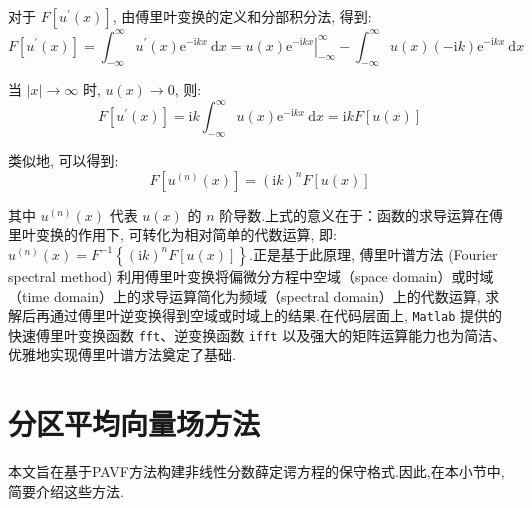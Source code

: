 对于 $F\left[u^{\prime}(x)\right]$, 由傅里叶变换的定义和分部积分法, 得到:
\begin{equation}
    F\left[u^{\prime}(x)\right] = \int_{-\infty}^{\infty} u^{\prime}(x) \mathrm{e}^{-\mathrm{i} k x} \mathrm{~d} x = \left.u(x) \mathrm{e}^{-\mathrm{i} k x}\right|_{-\infty}^{\infty} - \int_{-\infty}^{\infty} u(x)(-\mathrm{i} k) \mathrm{e}^{-\mathrm{i} k x} \mathrm{~d} x \label{eq:3-7}
\end{equation}

当 $\mid x\mid  \rightarrow \infty$ 时, $u(x) \rightarrow 0$, 则:
\begin{equation}
    F\left[u^{\prime}(x)\right] = \mathrm{i} k \int_{-\infty}^{\infty} u(x) \mathrm{e}^{-\mathrm{i} k x} \mathrm{~d} x = \mathrm{i} k F[u(x)] \label{eq:3-8}
\end{equation}

类似地, 可以得到:
\begin{equation}
    F\left[u^{(n)}(x)\right] = (\mathrm{i} k)^n F[u(x)] \label{eq:3-9}
\end{equation}

其中 $u^{(n)}(x)$ 代表 $u(x)$ 的 $n$ 阶导数.上式的意义在于：函数的求导运算在傅里叶变换的作用下, 可转化为相对简单的代数运算, 即: $u^{(n)}(x) = F^{-1}\left\{(\mathrm{i} k)^n F[u(x)]\right\}$.正是基于此原理, 傅里叶谱方法 (Fourier spectral method) 利用傅里叶变换将偏微分方程中空域（space domain）或时域（time domain）上的求导运算简化为频域（spectral domain）上的代数运算, 求解后再通过傅里叶逆变换得到空域或时域上的结果.在代码层面上, \texttt{Matlab} 提供的快速傅里叶变换函数 \texttt{fft}、逆变换函数 \texttt{ifft} 以及强大的矩阵运算能力也为简洁、优雅地实现傅里叶谱方法奠定了基础.


\section{分区平均向量场方法}

本文旨在基于PAVF方法构建非线性分数薛定谔方程的保守格式.因此,在本小节中,简要介绍这些方法.

